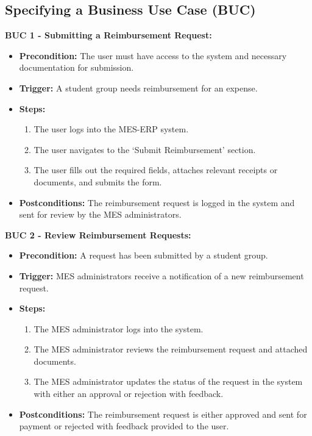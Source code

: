 \documentclass[12pt]{article}
\begin{document}
\subsection{Specifying a Business Use Case (BUC)}
\textbf{BUC 1 - Submitting a Reimbursement Request:}
\begin{itemize}
  \item \textbf{Precondition:} The user must have access to the system and necessary documentation for submission.
  \item \textbf{Trigger:} A student group needs reimbursement for an expense.
  \item \textbf{Steps:}
  \begin{enumerate}
      \item The user logs into the MES-ERP system.
      \item The user navigates to the  `Submit Reimbursement' section.
      \item The user fills out the required fields, attaches relevant receipts or documents, and submits the form.
  \end{enumerate}
  \item \textbf{Postconditions:} The reimbursement request is logged in the system and sent for review by the MES administrators.
\end{itemize}

\textbf{BUC 2 - Review Reimbursement Requests:}
\begin{itemize}
  \item \textbf{Precondition:} A request has been submitted by a student group.
  \item \textbf{Trigger:} MES administrators receive a notification of a new reimbursement request.
  \item \textbf{Steps:}
  \begin{enumerate}
      \item The MES administrator logs into the system.
      \item The MES administrator reviews the reimbursement request and attached documents.
      \item The MES administrator updates the status of the request in the system with either an approval or rejection with feedback.
  \end{enumerate}
  \item \textbf{Postconditions:} The reimbursement request is either approved and sent for payment or rejected with feedback provided to the user.
\end{itemize}
\end{document}
